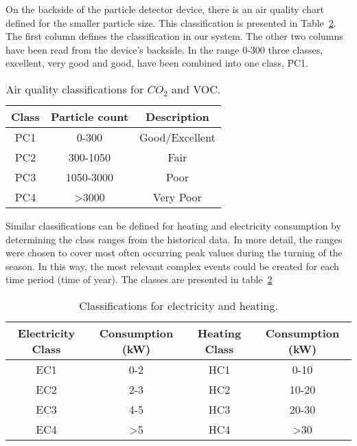 On the backside of the particle detector device, there is an air quality chart defined for the smaller particle size. This classification is presented in Table~\ref{table:particles}. The first column defines the classification in our system. The other two columns have been read from the device's backside. In the range 0-300 three classes, excellent, very good and good, have been combined into one class, PC1.

\begin{table}[h!]
\begin{center}
  \caption{Air quality classifications for $CO_2$ and VOC.} 
  \begin{tabular}{c|c|c}
  	Class & Particle count & Description \\
	\hline
	PC1 & 0-300 & Good/Excellent \\
	PC2 & 300-1050 & Fair \\
	PC3 & 1050-3000 & Poor \\
	PC4 & >3000 & Very Poor
  \end{tabular}
  \label{table:particles}
\end{center}
\end{table}


Similar classifications can be defined for heating and electricity consumption by determining the class ranges from the historical data. In more detail, the ranges were chosen to cover most often occurring peak values during the turning of the season. In this way, the most relevant complex events could be created for each time period (time of year). The classes are presented in table~\ref{table:particles}

\begin{table}[h!]
\begin{center}
  \caption{Classifications for electricity and heating.} 
  \begin{tabular}{c|c|c|c}
  	Electricity Class & Consumption (kW) & Heating Class & Consumption (kW) \\
	\hline
	EC1 & 0-2 & HC1 & 0-10 \\
	EC2 & 2-3 & HC2 & 10-20 \\
	EC3 & 4-5 & HC3 & 20-30 \\
	EC4 & >5 & HC4 & >30			
  \end{tabular}
  \label{table:particles}
\end{center}
\end{table}




